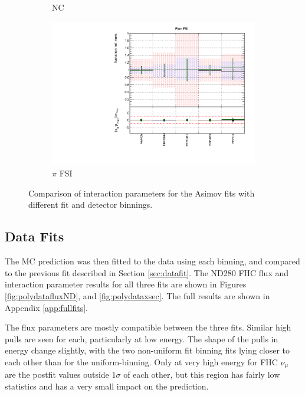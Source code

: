 \begin{figure}[!htbp]
\begin{subfigure}{0.49\textwidth}
  \caption{NC}
\end{subfigure}
\begin{subfigure}{0.49\textwidth}
  \centering
  \includegraphics[width=0.9\linewidth]{figs/polyasmvsxsec_5}
  \caption{$\pi$ FSI}
\end{subfigure}
\caption{Comparison of interaction parameters for the Asimov fits with different fit and detector binnings.}
\label{fig:polyasmvsxsec}
\end{figure}

\subsection{Data Fits}

The MC prediction was then fitted to the data using each binning, and compared to the previous fit described in Section \ref{sec:datafit}. The ND280 FHC flux and interaction parameter results for all three fits are shown in Figures \ref{fig:polydatafluxND}, and \ref{fig:polydataxsec}. The full results are shown in Appendix \ref{app:fullfits}.

The flux parameters are mostly compatible between the three fits. Similar high pulls are seen for each, particularly at low energy. The shape of the pulls in energy change slightly, with the two non-uniform fit binning fits lying closer to each other than for the uniform-binning. Only at very high energy for FHC $\nu_{\mu}$ are the postfit values outside $1\sigma$ of each other, but this region has fairly low statistics and has a very small impact on the \SK prediction.

